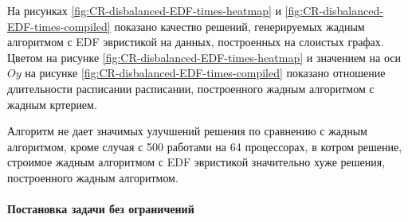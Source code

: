 На рисунках \ref{fig:CR-disbalanced-EDF-times-heatmap} и \ref{fig:CR-disbalanced-EDF-times-compiled} показано качество решений, генерируемых жадным алгоритмом с EDF эвристикой на данных, построенных на слоистых графах. Цветом на рисунке \ref{fig:CR-disbalanced-EDF-times-heatmap} и значением на оси $Oy$ на рисунке \ref{fig:CR-disbalanced-EDF-times-compiled} показано отношение длительности расписании расписании, построенного жадным алгоритмом с жадным кртерием.

Алгоритм не дает значимых улучшений решения по сравнению с жадным алгоритмом, кроме случая с 500 работами на 64 процессорах, в котром решение, строимое жадным алгоритмом с EDF эвристикой значительно хуже решения, построенного жадным алгоритмом.


\paragraph{Постановка задачи без ограничений}

